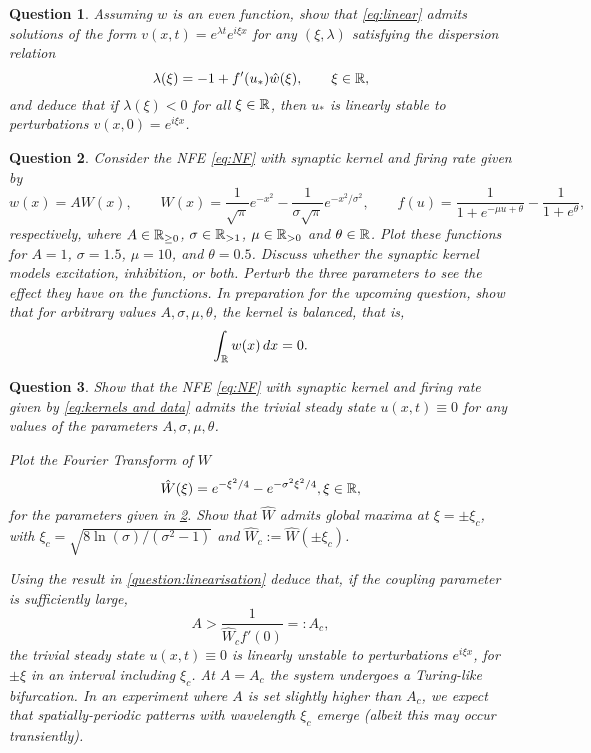 \documentclass[a4paper]{siamonline220329}
\theoremstyle{plain}
\newtheorem{question}{Question}
\begin{document}
\begin{question}\label{eq:eigenvalues}
  Assuming $w$ is an even function, show that \cref{eq:linear} admits solutions of the form $v(x,t) = e^{\lambda t}
  e^{i\xi x}$ for any $(\xi,\lambda)$ satisfying the \textit{dispersion relation}
  \[
    \lambda(\xi) = -1 + f'(u_*) \hat w(\xi), \qquad \xi \in \mathbb{R},
  \]
  and deduce that if $\lambda(\xi) < 0$ for all $\xi \in \mathbb{R}$, then $u_*$ is
  linearly stable to perturbations $v(x,0) = e^{i\xi x}$.
\end{question}

\begin{question}\label{question:kernels}
  Consider the NFE \cref{eq:NF} with synaptic kernel and firing rate given by
  \begin{equation}\label{eq:kernels and data}
    w(x) = A W(x), \qquad 
    W(x) = \frac{1}{\sqrt{\pi}}e^{-x^2} - \frac{1}{\sigma\sqrt{\pi}}e^{-x^2/\sigma^2},
    \qquad 
     f(u) = \frac{1}{1+e^{-\mu u+\theta}} - \frac{1}{1+e^{\theta}},
  \end{equation}
  respectively, where $A \in \mathbb{R}_{ \geq 0}$, $\sigma \in \mathbb{R}_{>1}$, $\mu \in \mathbb{R}_{>0}$ and
  $\theta \in \mathbb{R}$. Plot these functions for $A = 1$, $\sigma = 1.5$, $\mu = 10$,
  and $\theta = 0.5$. Discuss whether the synaptic
  kernel models excitation, inhibition, or both. Perturb the three parameters to see
  the effect they have on the functions. In preparation for the upcoming question,
  show that for arbitrary values $A, \sigma, \mu, \theta$, the kernel is
  \textit{balanced}, that is,
  \[
   \int_{\mathbb{R}} w(x) \,d x  = 0.
  \]
\end{question}


\begin{question} 
  Show that the NFE \cref{eq:NF} with synaptic kernel and firing rate given by
  \cref{eq:kernels and data} admits the trivial steady state $u(x,t) \equiv 0$ for any values
  of the parameters $A, \sigma, \mu, \theta$. 

  Plot the Fourier Transform of $W$
  \[
    \hat W(\xi) = e^{-\xi^2/4} -  e^{-\sigma^2\xi^2/4}, \xi \in \mathbb{R},
  \]
  for the parameters given in \cref{question:kernels}. Show that $\hat W$ admits
  global maxima at $\xi = \pm \xi_c$, with $\xi_c = \sqrt{8
  \ln(\sigma)/(\sigma^2-1)}$ and $\hat W_c := \hat W(\pm \xi_c)$.

  Using the result in \cref{question:linearisation} deduce that, if
  the coupling parameter is sufficiently large,
  \begin{equation}\label{eq:ACrit}
    A > \frac{1}{\hat W_c f'(0)}=:A_c,
  \end{equation}
  the trivial steady state $u(x,t) \equiv 0$ is linearly unstable to perturbations $e^{i\xi x}$,
  for $\pm \xi$ in an interval including $\xi_c$. At $A=A_c$ the system undergoes a
  Turing-like bifurcation. In an experiment where $A$ is set slightly higher than
  $A_c$, we expect that spatially-periodic patterns with wavelength $\xi_c$ emerge
  (albeit this may occur transiently).
\end{question} 
\end{document}
